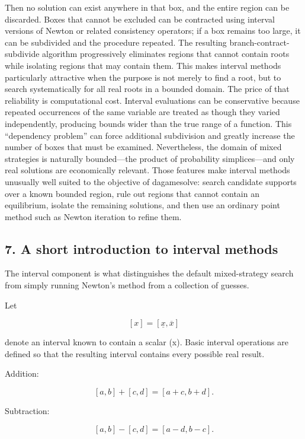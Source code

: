 \documentclass[11pt]{article}
\begin{document}
Then no solution can exist anywhere in that box, and the entire region
can be discarded. Boxes that cannot be excluded can be contracted using
interval versions of Newton or related consistency operators; if a box
remains too large, it can be subdivided and the procedure repeated. The
resulting branch-contract-subdivide algorithm progressively eliminates
regions that cannot contain roots while isolating regions that may
contain them. This makes interval methods particularly attractive when
the purpose is not merely to find a root, but to search systematically
for all real roots in a bounded domain. The price of that reliability is
computational cost. Interval evaluations can be conservative because
repeated occurrences of the same variable are treated as though they
varied independently, producing bounds wider than the true range of a
function. This ``dependency problem'' can force additional subdivision
and greatly increase the number of boxes that must be examined.
Nevertheless, the domain of mixed strategies is naturally bounded---the
product of probability simplices---and only real solutions are
economically relevant. Those features make interval methods unusually
well suited to the objective of dagamesolve: search candidate supports
over a known bounded region, rule out regions that cannot contain an
equilibrium, isolate the remaining solutions, and then use an ordinary
point method such as Newton iteration to refine them.

    \hypertarget{a-short-introduction-to-interval-methods}{%
\subsection{7. A short introduction to interval
methods}\label{a-short-introduction-to-interval-methods}}

The interval component is what distinguishes the default mixed-strategy
search from simply running Newton's method from a collection of guesses.

Let

\[
[x]=[\underline{x},\overline{x}]
\]

denote an interval known to contain a scalar (x). Basic interval
operations are defined so that the resulting interval contains every
possible real result.

Addition:

\[
[a,b]+[c,d]=[a+c,b+d].
\]

Subtraction:

\[
[a,b]-[c,d]=[a-d,b-c].
\]
\end{document}
